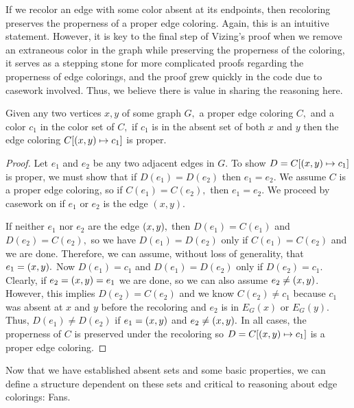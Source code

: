 If we recolor an edge with some color absent at its endpoints, then recoloring preserves the properness of a proper edge coloring. Again, this is an intuitive statement. However, it is key to the final step of Vizing's proof when we remove an extraneous color in the graph while preserving the properness of the coloring, it serves as a stepping stone for more complicated proofs regarding the properness of edge colorings, and the proof grew quickly in the code due to casework involved. Thus, we believe there is value in sharing the reasoning here.
\begin{lemma}\label{recolor_proper}
    Given any two vertices $x, y$ of some graph $G,$ a proper edge coloring $C,$ and a color $c_1$ in the color set of $C,$ if $c_1$ is in the absent set of both $x$ and $y$ then the edge coloring $C[(x, y)\mapsto c_1]$ is proper.
\end{lemma}
\begin{proof}
    Let $e_1$ and $e_2$ be any two adjacent edges in $G.$ To show $D = C[(x, y)\mapsto c_1]$ is proper, we must show that if $D(e_1) = D(e_2)$ then $e_1 = e_2.$ We assume $C$ is a proper edge coloring, so if $C(e_1) = C(e_2),$ then $e_1 = e_2$. We proceed by casework on if $e_1$ or $e_2$ is the edge $(x, y).$
    
    If neither $e_1$ nor $e_2$ are the edge $(x, y),$ then $D(e_1) = C(e_1)$ and $D(e_2) = C(e_2),$ so we have $D(e_1) = D(e_2)$ only if $C(e_1) = C(e_2)$ and we are done. Therefore, we can assume, without loss of generality, that $e_1 = (x, y).$ Now $D(e_1) = c_1$ and $D(e_1) = D(e_2)$ only if $D(e_2) = c_1.$ Clearly, if $e_2 = (x, y) = e_1$ we are done, so we can also assume $e_2 \neq (x, y)$. However, this implies $D(e_2) = C(e_2)$ and we know $C(e_2) \neq c_1$ because $c_1$ was absent at $x$ and $y$ before the recoloring and $e_2$ is in $E_G(x)$ or $E_G(y).$ Thus, $D(e_1) \neq D(e_2)$ if $e_1 = (x, y)$ and $e_2 \neq (x, y).$ In all cases, the properness of $C$ is preserved under the recoloring so $D = C[(x, y) \mapsto c_1]$ is a proper edge coloring.
\end{proof}

Now that we have established absent sets and some basic properties, we can define a structure dependent on these sets and critical to reasoning about edge colorings: Fans.

